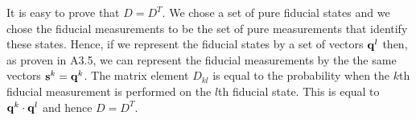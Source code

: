 \documentclass[12pt]{article}
\begin{document}
\vspace{4mm}


\vspace{4mm}

It is easy to prove that $D=D^T$.  We chose a set of pure fiducial
states and we chose the fiducial measurements to be the set of pure
measurements that identify these states.  Hence, if we represent the
fiducial states by a set of vectors ${\bf q}^l$ then, as proven in A3.5,
we can represent the fiducial measurements by the the same vectors ${\bf
s}^k={\bf q}^k$.  The matrix element $D_{kl}$ is equal to the probability when
the $k$th fiducial measurement is performed on the $l$th fiducial state.
This is equal to ${\bf q}^k\cdot{\bf q}^l$ and hence $D=D^T$.

\vspace{4mm}


\vspace{4mm}
\end{document}
